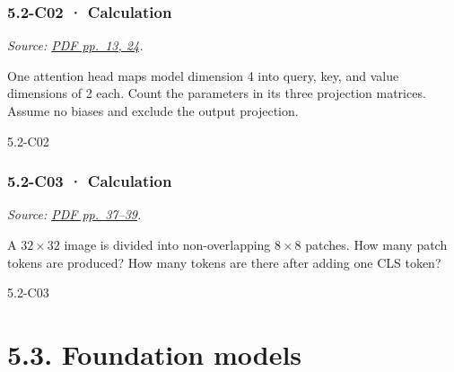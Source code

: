 \noindent\begin{minipage}{\linewidth}

\subsubsection{5.2-C02 · Calculation}\label{c02-calculation-13}

\emph{Source:
\href{../Lecture\%20Slides/5.2.\%20Transformers.pdf\#page=13}{PDF
pp.~13, 24}.}

One attention head maps model dimension 4 into query, key, and value
dimensions of 2 each. Count the parameters in its three projection
matrices. Assume no biases and exclude the output projection.

\begin{solution}[26mm]{5.2-C02}

\end{solution}
\end{minipage}\par\medskip

\noindent\begin{minipage}{\linewidth}

\subsubsection{5.2-C03 · Calculation}\label{c03-calculation-13}

\emph{Source:
\href{../Lecture\%20Slides/5.2.\%20Transformers.pdf\#page=37}{PDF
pp.~37--39}.}

A \(32\times32\) image is divided into non-overlapping \(8\times8\)
patches. How many patch tokens are produced? How many tokens are there
after adding one CLS token?

\begin{solution}[26mm]{5.2-C03}

\end{solution}
\end{minipage}\par\medskip

\clearpage

\section{5.3. Foundation models}\label{foundation-models}

